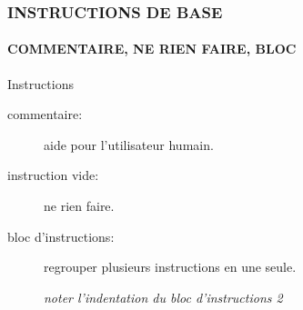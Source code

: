 \begin{frame}
\frametitle{\uppercase{Instructions de base}}
\framesubtitle{\uppercase{Commentaire, ne rien faire, bloc}}
\begin{block}{Instructions}
\begin{description}
\item[commentaire:] aide pour l'utilisateur humain.\vspace*{1mm}

\item[instruction vide:] ne rien faire.\vspace*{1mm}

\item[bloc d'instructions:] regrouper plusieurs instructions en une seule.\vspace*{1mm}

	
	{\footnotesize\em noter l'\alert{indentation} du bloc d'instructions 2}
\end{description}
\end{block}

\end{frame}
\note{}


